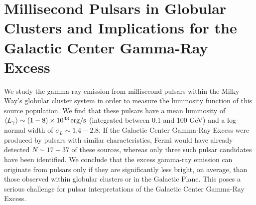 %
\chapter{Millisecond Pulsars in Globular Clusters and Implications for the Galactic Center Gamma-Ray Excess}
\label{ch:msp}

We study the gamma-ray emission from millisecond pulsars within the Milky Way's globular cluster system in order to measure the luminosity function of this source population. We find that these pulsars have a mean luminosity of
$\langle L_{\gamma}\rangle \sim (1-8)\times 10^{33}\, {\rm erg/s}$ (integrated between 0.1 and 100 GeV) and a log-normal width of $\sigma_L \sim 1.4-2.8$. If the Galactic Center Gamma-Ray Excess were produced by pulsars with similar characteristics, Fermi would have already detected $N \sim 17-37$ of these sources, whereas only three such pulsar candidates have been identified. We conclude that the excess gamma-ray emission can originate from pulsars only if they are significantly less bright, on average, than those observed within globular clusters or in the Galactic Plane. This poses a serious challenge for pulsar interpretations of the Galactic Center Gamma-Ray Excess.









\begin{subappendices}


\end{subappendices}
